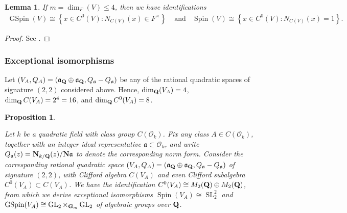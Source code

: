 \documentclass{amsart}
\newtheorem{lemma}[theorem]{Lemma}
\newtheorem{proposition}[theorem]{Proposition}
\theoremstyle{definition}
\theoremstyle{definition}
\theoremstyle{definition}
\begin{document}
\begin{lemma}\label{SL} If $m = \dim_F(V) \leq 4$, then we have identifications 
\begin{align*} \operatorname{GSpin}(V) \cong \left\lbrace x \in C^0(V): N_{C(V)}(x) \in F^{\times} \right\rbrace 
~~~~~\text{and}~~~~
\operatorname{Spin}(V) \cong \left\lbrace x \in C^0(V): N_{C(V)}(x) =1 \right\rbrace. \end{align*} \end{lemma}
\begin{proof} See \cite[Lemma 2.14]{Br-123}. \end{proof}

\subsubsection{Exceptional isomorphisms}

Let $(V_A, Q_A) = (\mathfrak{a}_{\bf{Q}} \oplus \mathfrak{a}_{\bf{Q}}, Q_{\mathfrak{a}} - Q_{\mathfrak{a}})$ be any 
of the rational quadratic spaces of signature $(2, 2)$ considered above. Hence, $\dim_{{\bf{Q}}}(V_A)=4$,
$\dim_{\bf{Q}} C(V_A) = 2^4 = 16$, and $\dim_{\bf{Q}} C^0(V_A) = 8$.

\begin{proposition}\label{Clifford2}

Let $k$ be a quadratic field with class group $C(\mathcal{O}_k)$.
Fix any class $A \in C(\mathcal{O}_k)$, together with an integer ideal representative $\mathfrak{a} \subset \mathcal{O}_k$,
and write $Q_{\mathfrak{a}}(z) = {\bf{N}}_{k/{\bf{Q}}}(z)/{\bf{N}} \mathfrak{a}$ to denote the corresponding norm form. 
Consider the corresponding rational quadratic space 
$(V_A, Q_A) = (\mathfrak{a}_{\bf{Q}} \oplus \mathfrak{a}_{\bf{Q}}, Q_{\mathfrak{a}} - Q_{\mathfrak{a}})$ of signature $(2, 2)$,
with Clifford algebra $C(V_A)$ and even Clifford subalgebra $C^0(V_A) \subset C(V_A)$. We have the identification
$C^0(V_A) \cong M_2({\bf{Q}}) \oplus M_2({\bf{Q}})$, from which we derive exceptional isomorphisms 
$\operatorname{Spin}(V_A) \cong \operatorname{SL}_2^2$ 
and $\operatorname{GSpin}(V_A) \cong  \operatorname{GL}_2 \times_{{\bf{G}}_m} \operatorname{GL}_2$ of algebraic groups over ${\bf{Q}}$. 

\end{proposition} 
\end{document}
